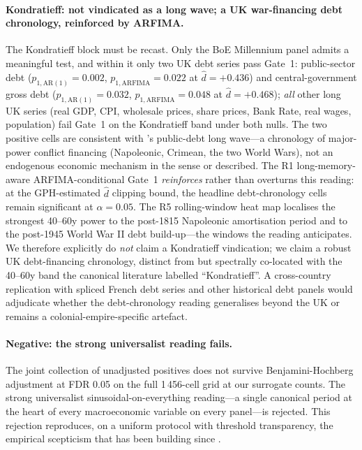 \paragraph{Kondratieff: not vindicated as a long wave; a UK
war-financing debt chronology, reinforced by ARFIMA.}
The Kondratieff block must be recast. Only the BoE
Millennium panel admits a meaningful test, and within it
only two UK debt series pass Gate~1: public-sector debt
(\(p_{1,\mathrm{AR(1)}}=0.002\),
\(p_{1,\mathrm{ARFIMA}}=0.022\) at \(\hat d=+0.436\)) and
central-government gross debt
(\(p_{1,\mathrm{AR(1)}}=0.032\),
\(p_{1,\mathrm{ARFIMA}}=0.048\) at \(\hat d=+0.468\));
\emph{all} other long UK series (real GDP, CPI, wholesale
prices, share prices, Bank Rate, real wages, population)
fail Gate~1 on the Kondratieff band under both nulls. The
two positive cells are consistent with
\citet{reinhart_rogoff2009}'s public-debt long wave---a
chronology of major-power conflict financing (Napoleonic,
Crimean, the two World Wars), not an endogenous economic
mechanism in the sense \citet{kondratieff1925} or
\citet{schumpeter1939} described. The R1 long-memory-aware
ARFIMA-conditional Gate~1 \emph{reinforces} rather than
overturns this reading: at the GPH-estimated \(\hat d\)
clipping bound, the headline debt-chronology cells remain
significant at \(\alpha=0.05\). The R5 rolling-window heat
map localises the strongest 40--60y power to the post-1815
Napoleonic amortisation period and to the post-1945 World
War II debt build-up---the windows the
\citet{reinhart_rogoff2009} reading anticipates. We
therefore explicitly do \emph{not} claim a Kondratieff
vindication; we claim a robust UK debt-financing
chronology, distinct from but spectrally co-located with
the 40--60y band the canonical literature labelled
``Kondratieff''. A cross-country replication with spliced
\citet{toutain1997} French debt series and other
historical debt panels would adjudicate whether the
debt-chronology reading generalises beyond the UK or
remains a colonial-empire-specific artefact.

\paragraph{Negative: the strong universalist reading fails.}
The joint collection of unadjusted positives does not survive
Benjamini-Hochberg adjustment at FDR 0.05 on the full
1\,456-cell grid at our surrogate counts. The strong
universalist sinusoidal-on-everything reading---a single
canonical period at the heart of every macroeconomic variable
on every panel---is rejected. This rejection reproduces, on a
uniform protocol with threshold transparency, the empirical
scepticism that
has been building since
\citet{garvy1943,solomou1987,romer1999,stock_watson2003,wen2005}.

